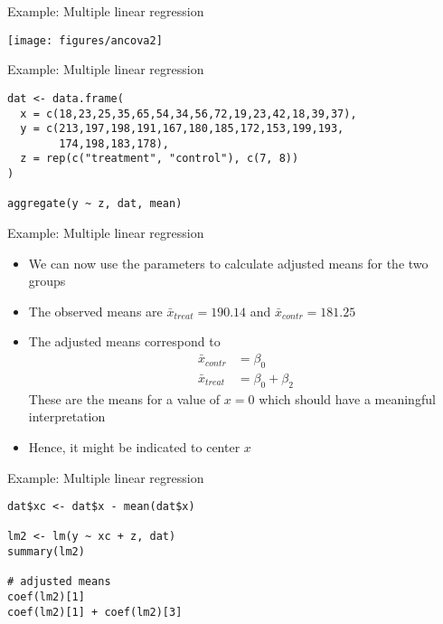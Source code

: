 \documentclass[aspectratio=169]{beamer}
\begin{document}
\begin{frame}[fragile]{Example: Multiple linear regression}
\begin{center}
\texttt{[image: figures/ancova2]}
\end{center}
\end{frame}

{

\begin{frame}[fragile]{Example: Multiple linear regression}
\begin{lstlisting}
dat <- data.frame(
  x = c(18,23,25,35,65,54,34,56,72,19,23,42,18,39,37),
  y = c(213,197,198,191,167,180,185,172,153,199,193,
        174,198,183,178),
  z = rep(c("treatment", "control"), c(7, 8))
)

aggregate(y ~ z, dat, mean)
\end{lstlisting}
\end{frame}

}


\begin{frame}[fragile]{Example: Multiple linear regression}
  \begin{itemize}
    \item We can now use the parameters to calculate adjusted means for the
      two groups
    \item The observed means are $\bar x_{treat} = 190.14$ and $\bar
      x_{contr} = 181.25$
    \item The adjusted means correspond to
\begin{align*}
\bar x_{contr} & = \beta_0\\
\bar x_{treat} & = \beta_0 + \beta_2
\end{align*}
These are the means for a value of $x = 0$ which should have a meaningful
interpretation
\item Hence, it might be indicated to center $x$
  \end{itemize}
\end{frame}

{

\begin{frame}[fragile]{Example: Multiple linear regression}
\begin{lstlisting}
dat$xc <- dat$x - mean(dat$x)

lm2 <- lm(y ~ xc + z, dat)
summary(lm2)

# adjusted means
coef(lm2)[1]
coef(lm2)[1] + coef(lm2)[3]
\end{lstlisting}
\end{frame}

}
\end{document}
